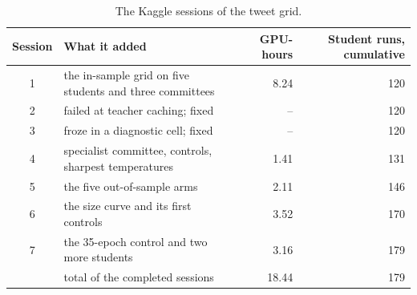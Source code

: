 \begin{table}[htbp]
\centering
\small
\caption{The Kaggle sessions of the tweet grid.}
\label{tab:sessions}
\begin{tabular}{clrr}
\toprule
Session & What it added & GPU-hours & Student runs, cumulative \\
\midrule
1 & the in-sample grid on five students and three committees & 8.24 & 120 \\
2 & failed at teacher caching; fixed & -- & 120 \\
3 & froze in a diagnostic cell; fixed & -- & 120 \\
4 & specialist committee, controls, sharpest temperatures & 1.41 & 131 \\
5 & the five out-of-sample arms & 2.11 & 146 \\
6 & the size curve and its first controls & 3.52 & 170 \\
7 & the 35-epoch control and two more students & 3.16 & 179 \\
\midrule
 & total of the completed sessions & 18.44 & 179 \\
\bottomrule
\end{tabular}
\end{table}
